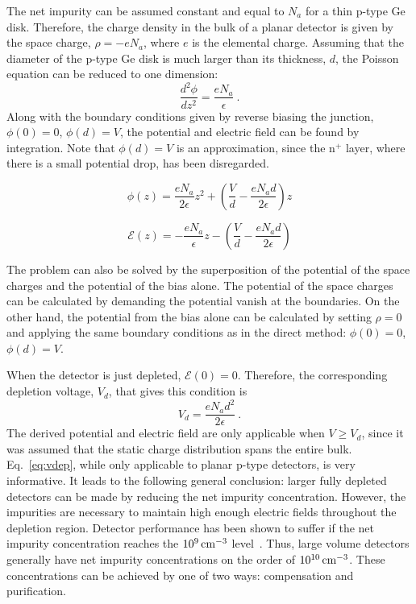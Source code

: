 The net impurity can be assumed constant and equal to $N_a$ for a thin p-type Ge disk. Therefore, the charge density in the bulk of a planar detector is given by the space charge, $\rho = -eN_a$, where $e$ is the elemental charge. Assuming that the diameter of the p-type Ge disk is much larger than its thickness, $d$, the Poisson equation can be reduced to one dimension:
\begin{equation}
	\frac{d^2\phi}{dz^2}=\frac{eN_a}{\epsilon}~.
	\label{eq:poisson_planar}
\end{equation}
Along with the boundary conditions given by reverse biasing the junction, $\phi(0) = 0$, $\phi(d) = V$, the potential and electric field can be found by integration. Note that $\phi(d) = V$ is an approximation, since the n$^+$ layer, where there is a small potential drop, has been disregarded.
\vspace{-1.5\baselineskip}
\begin{multicols}{2}
	\begin{equation}
		\phi(z) = \frac{eN_a}{2\epsilon}z^2 +\left(\frac{V}{d} -  \frac{eN_ad}{2\epsilon}\right)z
	\label{eq:pot_planar}
	\end{equation}

	\begin{equation}
		\mathcal{E}(z) = -\frac{eN_a}{\epsilon}z -\left(\frac{V}{d} -  \frac{eN_ad}{2\epsilon}\right)
	\label{eq:efield_planar}
	\end{equation}
\end{multicols}
\noindent The problem can also be solved by the superposition of the potential of the space charges and the potential of the bias alone. The potential of the space charges can be calculated by demanding the potential vanish at the boundaries. On the other hand, the potential from the bias alone can be calculated by setting $\rho = 0$ and applying the same boundary conditions as in the direct method: $\phi(0) = 0$, $\phi(d) = V$. 

When the detector is just depleted, $\mathcal{E}(0) = 0$. Therefore, the corresponding depletion voltage, $V_d$, that gives this condition is
\begin{equation}
	V_d = \frac{eN_ad^2}{2\epsilon}~.
	\label{eq:vdep}
\end{equation} 
The derived potential and electric field are only applicable when $V \ge V_d$, since it was assumed that the static charge distribution spans the entire bulk. Eq.~\ref{eq:vdep}, while only applicable to planar p-type detectors, is very informative. It leads to the following general conclusion: larger fully depleted detectors can be made by reducing the net impurity concentration. However, the impurities are necessary to maintain high enough electric fields throughout the depletion region. Detector performance has been shown to suffer if the net impurity concentration reaches the $10^{9}\text{\,cm}^{-3}$ level~\cite{low_conc_dets}. Thus, large volume detectors generally have net impurity concentrations on the order of $10^{10}\text{\,cm}^{-3}$. These concentrations can be achieved by one of two ways: compensation and purification. 

